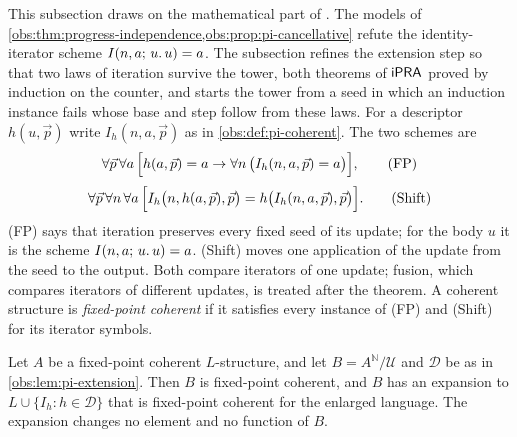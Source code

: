 This subsection draws on the mathematical part of
. The models of
\cref{obs:thm:progress-independence,obs:prop:pi-cancellative} refute the
identity-iterator scheme $I(n,a;\,u.\,u)=a$. The subsection refines the
extension step so that two laws of iteration survive the tower, both theorems
of $\mathsf{iPRA}$ proved by induction on the counter, and starts the tower from a seed
in which an induction instance fails whose base and step follow from these laws.
For a descriptor $h(u,\vec p)$ write $I_h(n,a,\vec p)$ as in
\cref{obs:def:pi-coherent}. The two schemes are
\[
\forall\vec p\,\forall a\,\Bigl[h(a,\vec p)=a\to
\forall n\,\bigl(I_h(n,a,\vec p)=a\bigr)\Bigr],
\tag{FP}
\]
\[
\forall\vec p\,\forall n\,\forall a\,\Bigl[
I_h\bigl(n,h(a,\vec p),\vec p\bigr)=h\bigl(I_h(n,a,\vec p),\vec p\bigr)\Bigr].
\tag{Shift}
\]
(FP) says that iteration preserves every fixed seed of its update; for the
body $u$ it is the scheme $I(n,a;\,u.\,u)=a$. (Shift) moves one application of
the update from the seed to the output. Both compare iterators of one update;
fusion, which compares iterators of different updates, is treated after the
theorem. A coherent structure is \emph{fixed-point coherent} if it satisfies
every instance of (FP) and (Shift) for its iterator symbols.

\begin{lemma}
\label{obs:lem:fp-extension}
Let $A$ be a fixed-point coherent $L$-structure, and let
$B=A^{\mathbb{N}}/\mathcal{U}$ and $\mathcal{D}$ be as in
\cref{obs:lem:pi-extension}. Then $B$ is fixed-point coherent, and $B$ has an
expansion to $L\cup\{I_h:h\in\mathcal{D}\}$ that is fixed-point coherent for
the enlarged language. The expansion changes no element and no function of $B$.
\end{lemma}

